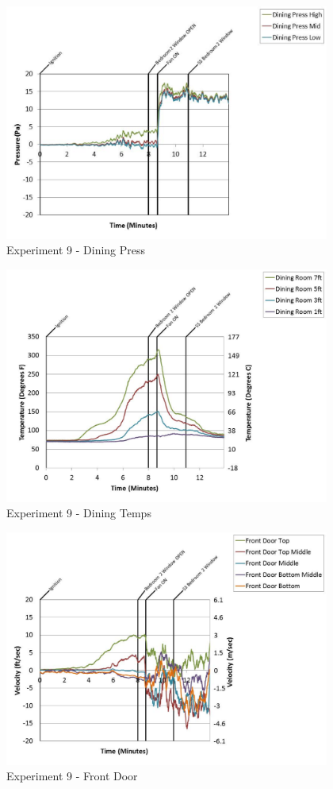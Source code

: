 \documentclass{article}
\begin{document}
\begin{appendices}
	\begin{figure}[h!]
		\centering
		\includegraphics[height=3.05in]{0_Images/Results_Charts/Exp_9_Charts/DiningPress.pdf}
		\caption{Experiment 9 - Dining Press}
	\end{figure}
 
	\clearpage

	\begin{figure}[h!]
		\centering
		\includegraphics[height=3.05in]{0_Images/Results_Charts/Exp_9_Charts/DiningTemps.pdf}
		\caption{Experiment 9 - Dining Temps}
	\end{figure}
 

	\begin{figure}[h!]
		\centering
		\includegraphics[height=3.05in]{0_Images/Results_Charts/Exp_9_Charts/FrontDoor.pdf}
		\caption{Experiment 9 - Front Door}
	\end{figure}
 

\end{appendices}
\end{document}
